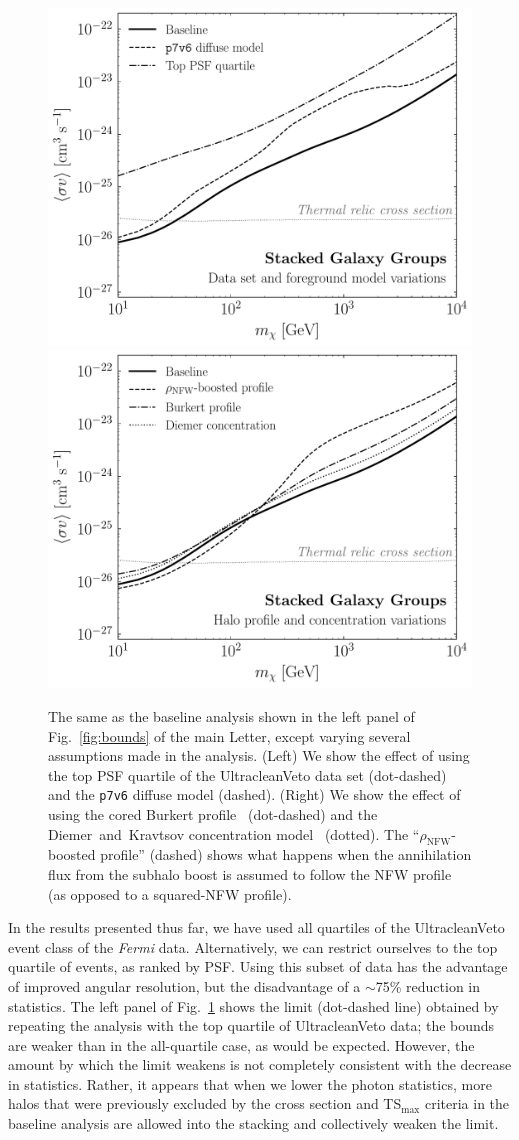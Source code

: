 \begin{figure}[t]
  \centering
  \includegraphics[width=.45\textwidth]{ch-clusters/plots/systematics_dataset.pdf}
  \includegraphics[width=.45\textwidth]{ch-clusters/plots/systematics_profile_conc.pdf}
  \caption{The same as the baseline analysis shown in the left panel of Fig.~\ref{fig:bounds} of the main Letter, except varying several assumptions made in the analysis.  (Left) We show the effect of using the top PSF quartile of the UltracleanVeto data set (dot-dashed) and the \texttt{p7v6} diffuse model (dashed).  (Right) We show the effect of using the cored Burkert profile~\cite{Burkert:1995yz} (dot-dashed) and the Diemer~and~Kravtsov concentration model~\cite{Diemer:2014gba} (dotted).  The ``$\rho_\text{NFW}$-boosted profile'' (dashed) shows what happens when the annihilation flux from the subhalo boost is assumed to follow the NFW profile (as opposed to a squared-NFW profile). }
  \label{fig:systematics_data_profile}
\end{figure}

In the results presented thus far, we have used all quartiles of the UltracleanVeto event class of the {\it Fermi} data.  Alternatively, we can restrict ourselves to the top quartile of events, as ranked by PSF.  Using this subset of data has the advantage of improved angular resolution, but the disadvantage of a $\sim$75\% reduction in statistics.  The  left panel of Fig.~\ref{fig:systematics_data_profile} shows the limit (dot-dashed line) obtained by repeating the analysis with the top quartile of UltracleanVeto data; the bounds are weaker than in the all-quartile case, as would be expected.  However, the amount by which the limit weakens is not completely consistent with the decrease in statistics.  Rather, it appears that when we lower the photon statistics, more halos that were previously excluded by the cross section and TS$_\text{max}$ criteria in the baseline analysis are allowed into the stacking and collectively weaken the limit.

